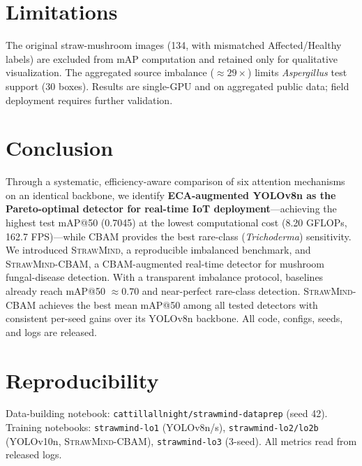 \documentclass[11pt]{article}
\newcommand{\sm}{\textsc{StrawMind}}
\newcommand{\smc}{\textsc{StrawMind-CBAM}}
\begin{document}
\section{Limitations}
The original straw-mushroom images (134, with mismatched Affected/Healthy labels) are excluded from
mAP computation and retained only for qualitative visualization. The aggregated source imbalance
($\approx29\times$) limits \emph{Aspergillus} test support (30 boxes). Results are single-GPU and
on aggregated public data; field deployment requires further validation.

\section{Conclusion}
Through a systematic, efficiency-aware comparison of six attention mechanisms on an identical backbone, we identify \textbf{ECA-augmented YOLOv8n as the Pareto-optimal detector for real-time IoT deployment}---achieving the highest test mAP@50 (0.7045) at the lowest computational cost (8.20 GFLOPs, 162.7 FPS)---while CBAM provides the best rare-class (\emph{Trichoderma}) sensitivity. We introduced \sm, a reproducible imbalanced benchmark, and \smc, a CBAM-augmented real-time
detector for mushroom fungal-disease detection. With a transparent imbalance protocol, baselines
already reach mAP@50 $\approx0.70$ and near-perfect rare-class detection. \smc{} achieves the best mean mAP@50 among all tested detectors with consistent per-seed gains over its YOLOv8n backbone. All code, configs, seeds, and logs are released.

\section*{Reproducibility}
Data-building notebook: \texttt{cattillallnight/strawmind-dataprep} (seed 42). Training notebooks:
\texttt{strawmind-lo1} (YOLOv8n/s), \texttt{strawmind-lo2/lo2b} (YOLOv10n, \smc), \texttt{strawmind-lo3} (3-seed). All metrics read from
released logs.



\end{document}
